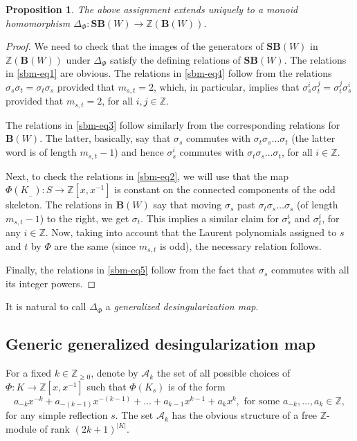 \documentclass[a4paper]{amsart}
\newtheorem{proposition}[theorem]{Proposition}
\begin{document}
\begin{proposition}\label{prop2}
The above assignment extends uniquely to a monoid homomorphism
$\Delta_\Phi:\mathbf{SB}(W)\to \mathbb{Z}(\mathbf{B}(W))$.
\end{proposition}

\begin{proof}
We need to check that the images of the generators of $\mathbf{SB}(W)$
in $\mathbb{Z}(\mathbf{B}(W))$ under $\Delta_\Phi$
satisfy the defining relations of $\mathbf{SB}(W)$.
The relations in \eqref{sbm-eq1} are obvious. The relations in 
\eqref{sbm-eq4} follow from the relations 
$\sigma_s\sigma_t=\sigma_t\sigma_s$ provided that $m_{s,t}=2$,
which, in particular, implies that $\sigma_s^i\sigma_t^j=\sigma_t^j\sigma_s^i$
provided that $m_{s,t}=2$, for all $i,j\in\mathbb{Z}$.

The relations in \eqref{sbm-eq3} follow similarly from the 
corresponding relations for $\mathbf{B}(W)$. The latter, basically, say
that $\sigma_s$ commutes with $\sigma_t\sigma_s\dots \sigma_t$ 
(the latter word is of length $m_{s,t}-1$) and hence
$\sigma_s^i$ commutes with $\sigma_t\sigma_s\dots \sigma_t$, for all
$i\in \mathbb{Z}$.

Next, to check the relations in \eqref{sbm-eq2}, we will use
that the map $\Phi(K_{{}_-}):S\to \mathbb{Z}[x,x^{-1}]$ 
is constant on the connected components of 
the odd skeleton. The relations in $\mathbf{B}(W)$ say that moving
$\sigma_s$ past $\sigma_t\sigma_s\dots \sigma_s$ (of length $m_{s,t}-1$)
to the right, we get $\sigma_t$. This implies a similar claim for
$\sigma_s^i$ and $\sigma^i_t$, for any $i\in \mathbb{Z}$. Now, taking into
account that the Laurent polynomials assigned to $s$ and $t$ by $\Phi$
are the same (since $m_{s,t}$ is odd), the necessary relation follows.

Finally, the relations in \eqref{sbm-eq5} follow from the fact that 
$\sigma_s$ commutes with all its integer powers.
\end{proof}

It is natural to call $\Delta_\Phi$ a {\em generalized desingularization map}.

\subsection{Generic generalized desingularization map}\label{s3.4}

For a fixed $k\in\mathbb{Z}_{\geq 0}$, denote by $\mathcal{A}_k$
the set of all possible choices of $\Phi:K\to \mathbb{Z}[x,x^{-1}]$
such that $\Phi(K_s)$ is of the form
\begin{displaymath}
a_{-k}x^{-k}+a_{-(k-1)}x^{-(k-1)}+\dots+a_{k-1}x^{k-1}+a_{k}x^{k},
\text{ for some }  a_{-k},\dots, a_{k}\in\mathbb{Z},
\end{displaymath}
for any simple reflection $s$. The set $\mathcal{A}_k$ has the obvious structure
of a free $\mathbb{Z}$-module of rank $(2k+1)^{|K|}$.
\end{document}
